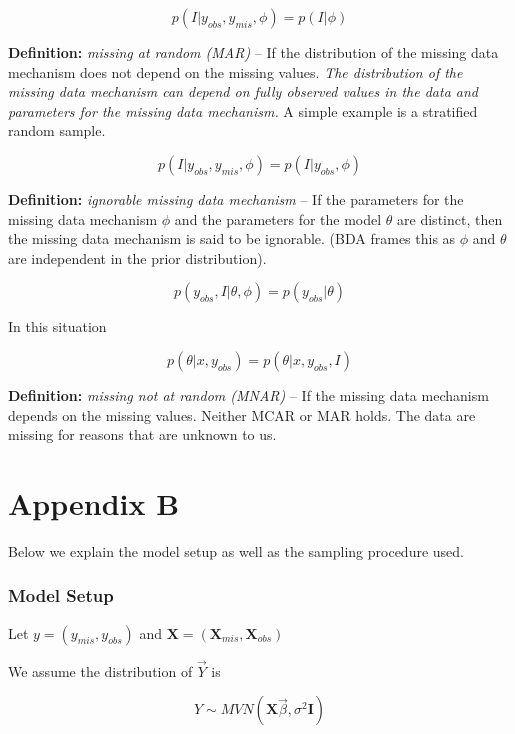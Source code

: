 \documentclass[11pt]{article}
\begin{document}
$$p(I|y_{obs}, y_{mis}, \phi) = p(I| \phi)$$

\vspace{0.25in}

\textbf{Definition:} \textit{missing at random (MAR)} -- If the distribution of the missing data mechanism does not depend on the missing values. \textit{The distribution of the missing data mechanism can depend on fully observed values in the data and parameters for the missing data mechanism.} A simple example is a stratified random sample. 

$$p(I|y_{obs}, y_{mis}, \phi) = p(I|y_{obs}, \phi)$$

\vspace{0.25in}

\textbf{Definition:} \textit{ignorable missing data mechanism} -- If the parameters for the missing data mechanism $\phi$ and the parameters for the model $\theta$ are distinct, then the missing data mechanism is said to be ignorable. (BDA frames this as $\phi$ and $\theta$ are independent in the prior distribution). 

$$p(y_{obs},I|\theta, \phi) = p(y_{obs}|\theta)$$

In this situation

$$p(\theta|x, y_{obs}) = p(\theta|x, y_{obs}, I)$$

\vspace{0.25in}

\textbf{Definition:} \textit{missing not at random (MNAR)} -- If the missing data mechanism depends on the missing values. Neither MCAR or MAR holds. The data are missing for reasons that are unknown to us. 

\vspace{0.5in}

\newpage
\section{Appendix B}

Below we explain the model setup as well as the sampling procedure used.

\subsubsection{Model Setup}

Let $y = (y_{mis}, y_{obs})$ and $\mathbf{X} = (\mathbf{X}_{mis}, \mathbf{X}_{obs})$

We assume the distribution of $\vec{Y}$ is

$$Y \sim MVN(\mathbf{X}\vec{\beta}, \sigma^2\mathbf{I})$$
\end{document}

